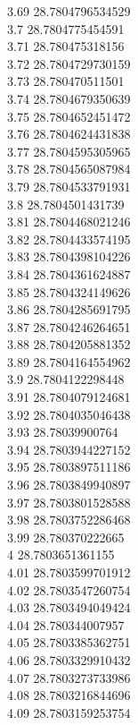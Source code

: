 {3.69	28.7804796534529\\
3.7	28.7804775454591\\
3.71	28.780475318156\\
3.72	28.7804729730159\\
3.73	28.780470511501\\
3.74	28.7804679350639\\
3.75	28.7804652451472\\
3.76	28.7804624431838\\
3.77	28.7804595305965\\
3.78	28.7804565087984\\
3.79	28.7804533791931\\
3.8	28.7804501431739\\
3.81	28.7804468021246\\
3.82	28.7804433574195\\
3.83	28.7804398104226\\
3.84	28.7804361624887\\
3.85	28.7804324149626\\
3.86	28.7804285691795\\
3.87	28.7804246264651\\
3.88	28.7804205881352\\
3.89	28.7804164554962\\
3.9	28.7804122298448\\
3.91	28.7804079124681\\
3.92	28.7804035046438\\
3.93	28.78039900764\\
3.94	28.7803944227152\\
3.95	28.7803897511186\\
3.96	28.7803849940897\\
3.97	28.7803801528588\\
3.98	28.7803752286468\\
3.99	28.780370222665\\
4	28.7803651361155\\
4.01	28.7803599701912\\
4.02	28.7803547260754\\
4.03	28.7803494049424\\
4.04	28.780344007957\\
4.05	28.7803385362751\\
4.06	28.7803329910432\\
4.07	28.7803273733986\\
4.08	28.7803216844696\\
4.09	28.7803159253754\\
}
